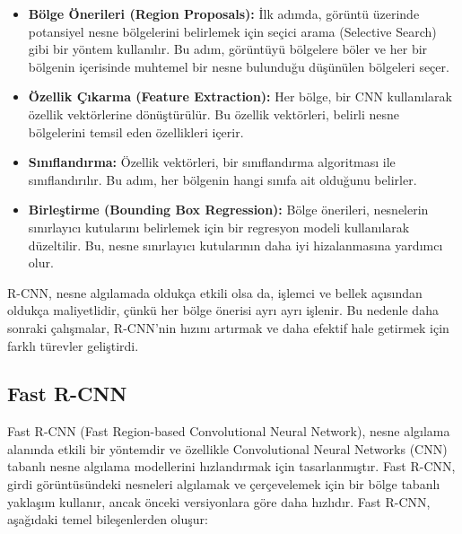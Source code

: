 \begin{itemize}
    \item \textbf{Bölge Önerileri (Region Proposals):} İlk adımda, görüntü üzerinde potansiyel nesne bölgelerini belirlemek için seçici arama (Selective Search) gibi bir yöntem kullanılır. Bu adım, görüntüyü bölgelere böler ve her bir bölgenin içerisinde muhtemel bir nesne bulunduğu düşünülen bölgeleri seçer.
    \item \textbf{Özellik Çıkarma (Feature Extraction):} Her bölge, bir CNN kullanılarak özellik vektörlerine dönüştürülür. Bu özellik vektörleri, belirli nesne bölgelerini temsil eden özellikleri içerir.
    \item \textbf{Sınıflandırma:} Özellik vektörleri, bir sınıflandırma algoritması ile sınıflandırılır. Bu adım, her bölgenin hangi sınıfa ait olduğunu belirler.
    \item \textbf{Birleştirme (Bounding Box Regression):} Bölge önerileri, nesnelerin sınırlayıcı kutularını belirlemek için bir regresyon modeli kullanılarak düzeltilir. Bu, nesne sınırlayıcı kutularının daha iyi hizalanmasına yardımcı olur.
\end{itemize}
R-CNN, nesne algılamada oldukça etkili olsa da, işlemci ve bellek açısından oldukça maliyetlidir, çünkü her bölge önerisi ayrı ayrı işlenir. Bu nedenle daha sonraki çalışmalar, R-CNN'nin hızını artırmak ve daha efektif hale getirmek için farklı türevler geliştirdi.

\subsection{Fast R-CNN}
Fast R-CNN (Fast Region-based Convolutional Neural Network), nesne algılama alanında etkili bir yöntemdir ve özellikle Convolutional Neural Networks (CNN) tabanlı nesne algılama modellerini hızlandırmak için tasarlanmıştır. Fast R-CNN, girdi görüntüsündeki nesneleri algılamak ve çerçevelemek için bir bölge tabanlı yaklaşım kullanır, ancak önceki versiyonlara göre daha hızlıdır. Fast R-CNN, aşağıdaki temel bileşenlerden oluşur:

